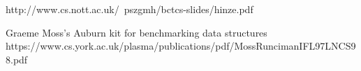 http://www.cs.nott.ac.uk/~pszgmh/bctcs-slides/hinze.pdf

Graeme Moss's Auburn kit for benchmarking data structures
https://www.cs.york.ac.uk/plasma/publications/pdf/MossRuncimanIFL97LNCS98.pdf

